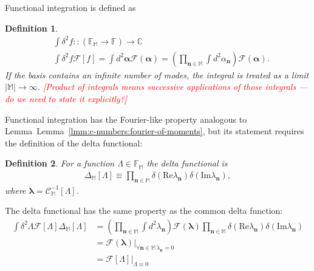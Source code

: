 \documentclass[12pt,aip,jmp,amssymb,amsmath]{revtex4-1}
\newcommand{\todo}[1]{\textcolor{red}{[#1]}}
\newcommand{\nvec}{\boldsymbol{n}}
\newcommand{\balpha}{\boldsymbol{\alpha}}
\newcommand{\blambda}{\boldsymbol{\lambda}}
\newcommand{\Real}{\mathrm{Re}}
\newcommand{\Imag}{\mathrm{Im}}
\newcommand{\restbasis}{\mathbb{M}}
\newcommand{\lmmref}[1]{Lemma~\ref{lmm:#1}}
\newtheorem{definition}{Definition}
\begin{document}
Functional integration is defined as

\begin{definition}
    \begin{equation*}\begin{split}
        & \int \delta^2 f :: (\mathbb{F}_{\restbasis} \rightarrow \mathbb{F}) \rightarrow \mathbb{C} \\
        & \int \delta^2 f \mathcal{F}[f]
        = \int d^2\balpha \mathcal{F}(\balpha)
        = \left(
            \prod_{\nvec \in \restbasis} \int d^2\alpha_{\nvec}
        \right) \mathcal{F}(\balpha).
    \end{split}\end{equation*}
    If the basis contains an infinite number of modes, the integral is treated as a limit $|\restbasis| \rightarrow \infty$.
    \todo{Product of integrals means successive applications of those integrals --- do we need to state it explicitly?}
\end{definition}

Functional integration has the Fourier-like property analogous to Lemma~\lmmref{c-numbers:fourier-of-moments}, but its statement requires the definition of the delta functional:

\begin{definition}
\label{def:func-calculus:delta-functional}
    For a function $\Lambda \in \mathbb{F}_{\restbasis}$ the delta functional is
    \begin{equation*}\begin{split}
        \Delta_{\restbasis}[\Lambda]
        \equiv \prod_{\nvec \in \restbasis} \delta(\Real \lambda_{\nvec}) \delta(\Imag \lambda_{\nvec}),
    \end{split}\end{equation*}
    where $\blambda = \mathcal{C}_{\restbasis}^{-1}[\Lambda]$.
\end{definition}

The delta functional has the same property as the common delta function:
\begin{equation}\begin{split}
    \int \delta^2 \Lambda \mathcal{F}[\Lambda] \Delta_{\restbasis}[\Lambda]
    & = \left(
            \prod_{\nvec \in \restbasis} \int d^2\lambda_{\nvec}
        \right)
        \mathcal{F}(\blambda)
        \prod_{\nvec \in \restbasis} \delta(\Real \lambda_{\nvec}) \delta(\Imag \lambda_{\nvec}) \\
    & = \left. \mathcal{F}(\blambda) \right|_{\forall \nvec \in \restbasis\, \lambda_{\nvec} = 0} \\
    & = \left. \mathcal{F}[\Lambda] \right|_{\Lambda \equiv 0}
\end{split}\end{equation}
\end{document}
